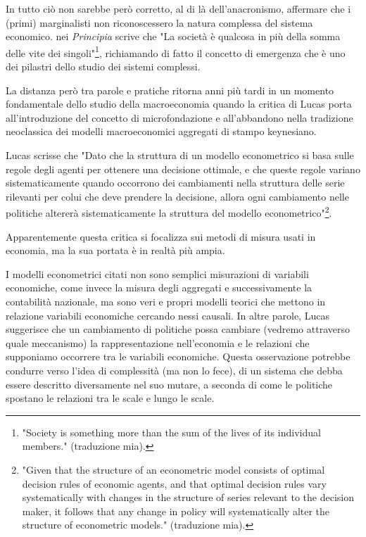 \documentclass[a4paper, headings=standardclasses]{scrartcl}
\begin{document}
In tutto ciò non sarebbe però corretto, al di là dell'anacronismo, affermare che i (primi) marginalisti non riconoscessero la natura complessa del sistema economico.
\textcite[p. 20]{marshall1988} nei \textit{Principia} scrive che "La società è qualcosa in più della somma delle vite dei singoli"\footnote{"Society is something more than the sum of the lives of its individual members." (traduzione mia).}, richiamando di fatto il concetto di emergenza che è uno dei pilastri dello studio dei sistemi complessi.

La distanza però tra parole e pratiche ritorna anni più tardi in un momento fondamentale dello studio della macroeconomia quando la critica di Lucas \parencite{lucas1976} porta all'introduzione del concetto di microfondazione e all'abbandono nella tradizione neoclassica dei modelli macroeconomici aggregati di stampo keynesiano.

Lucas scrisse che "Dato che la struttura di un modello econometrico si basa sulle regole degli agenti per ottenere una decisione ottimale, e che queste regole variano sistematicamente quando occorrono dei cambiamenti nella struttura delle serie rilevanti per colui che deve prendere la decisione, allora ogni cambiamento nelle politiche altererà sistematicamente la struttura del modello econometrico"\footnote{"Given that the structure of an econometric model consists of optimal decision rules of economic agents, and that optimal decision rules vary systematically with changes in the structure of series relevant to the decision maker, it follows that any change in policy will systematically alter the structure of econometric models." \parencite{lucas1976} (traduzione mia).}.

Apparentemente questa critica si focalizza sui metodi di misura usati in economia, ma la sua portata è in realtà più ampia.

I modelli econometrici citati non sono semplici misurazioni di variabili economiche, come invece la misura degli aggregati e successivamente la contabilità nazionale, ma sono veri e propri modelli teorici che mettono in relazione variabili economiche cercando nessi causali.
In altre parole, Lucas suggerisce che un cambiamento di politiche possa cambiare (vedremo attraverso quale meccanismo) la rappresentazione nell'economia e le relazioni che supponiamo occorrere tra le variabili economiche.
Questa osservazione potrebbe condurre verso l'idea di complessità (ma non lo fece), di un sistema che debba essere descritto diversamente nel suo mutare, a seconda di come le politiche spostano le relazioni tra le scale e lungo le scale.
\end{document}
